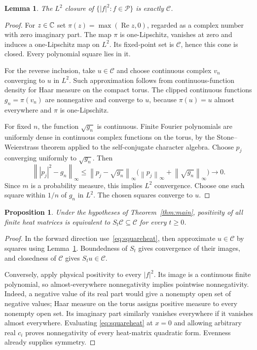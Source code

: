 \documentclass[11pt]{article}
\newtheorem{lemma}[theorem]{Lemma}
\newtheorem{proposition}[theorem]{Proposition}
\theoremstyle{remark}\newtheorem{remark}[theorem]{Remark}
\newcommand{\norm}[1]{\left\lVert#1\right\rVert}
\begin{document}
\begin{lemma}\label{lem:cone}
The $L^2$ closure of $\{|f|^2:f\in\mathcal P\}$ is exactly
$\mathcal C$.
\end{lemma}
\begin{proof}
For $z\in\mathbb C$ set $\pi(z)=\max(\operatorname{Re}z,0)$, regarded
as a complex number with zero imaginary part. The map $\pi$ is
one-Lipschitz, vanishes at zero and induces a one-Lipschitz map
on $L^2$. Its fixed-point set is $\mathcal C$, hence this cone
is closed. Every polynomial square lies in it.

For the reverse inclusion, take $u\in\mathcal C$ and choose
continuous complex $v_n$ converging to $u$ in $L^2$. Such
approximation follows from continuous-function density for Haar
measure on the compact torus. The clipped continuous functions
$g_n=\pi(v_n)$ are nonnegative and converge to $u$, because
$\pi(u)=u$ almost everywhere and $\pi$ is one-Lipschitz.

For fixed $n$, the function $\sqrt{g_n}$ is continuous. Finite
Fourier polynomials are uniformly dense in continuous complex
functions on the torus, by the Stone--Weierstrass theorem applied
to the self-conjugate character algebra. Choose $p_j$ converging
uniformly to $\sqrt{g_n}$. Then
\[
 \norm{|p_j|^2-g_n}_\infty
 \leq\norm{p_j-\sqrt{g_n}}_\infty
              \bigl(\norm{p_j}_\infty+\norm{\sqrt{g_n}}_\infty\bigr)
 \longrightarrow0.
\]
Since $m$ is a probability measure, this implies $L^2$
convergence. Choose one such square within $1/n$ of $g_n$ in
$L^2$. The chosen squares converge to $u$.
\end{proof}

\begin{proposition}\label{prop:physical}
Under the hypotheses of Theorem~\ref{thm:main}, positivity of all
finite heat matrices is equivalent to $S_t\mathcal C\subseteq
\mathcal C$ for every $t\geq0$.
\end{proposition}
\begin{proof}
In the forward direction use~\eqref{eq:squareheat}, then approximate
$u\in\mathcal C$ by squares using Lemma~\ref{lem:cone}.
Boundedness of $S_t$ gives convergence of their images, and
closedness of $\mathcal C$ gives $S_tu\in\mathcal C$.

Conversely, apply physical positivity to every $|f|^2$.
Its image is a continuous finite polynomial, so almost-everywhere
nonnegativity implies pointwise nonnegativity. Indeed, a negative
value of its real part would give a nonempty open set of negative
values; Haar measure on the torus assigns positive measure to
every nonempty open set. Its imaginary part similarly vanishes
everywhere if it vanishes almost everywhere. Evaluating
\eqref{eq:squareheat} at $x=0$ and allowing arbitrary real $c_i$
proves nonnegativity of every heat-matrix quadratic form.
Evenness already supplies symmetry.
\end{proof}
\end{document}
